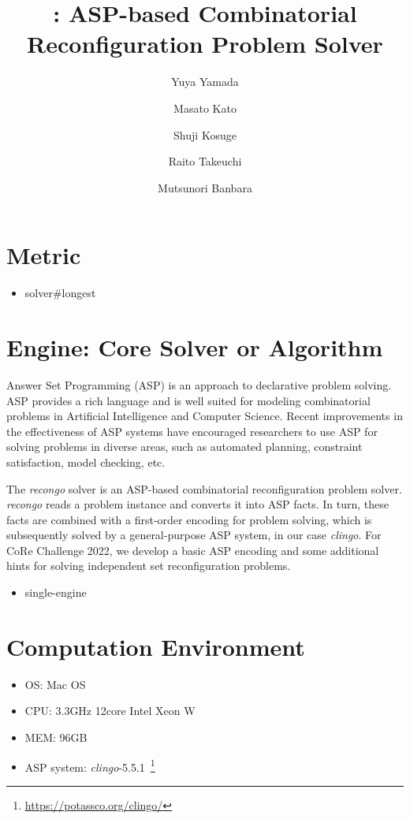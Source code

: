 \documentclass[a4paper,dvipdfmx]{article}
\date{}
\title{{\recongo}: ASP-based Combinatorial Reconfiguration Problem Solver}
\author[1]{Yuya Yamada}
\author[2]{Masato Kato}
\author[2]{Shuji Kosuge}
\author[1]{Raito Takeuchi}
\author[1]{Mutsunori Banbara}
\affil[1]{Graduate School of Informatics, Nagoya University, Japan}
\affil[2]{School of Informatics, Nagoya University, Japan}
\newcommand{\clingo}{\textit{clingo}}
\newcommand{\recongo}{\textit{recongo}}
\begin{document}
\maketitle

\section{Metric}
\begin{itemize}
  \item solver{\#}longest
\end{itemize}

\section{Engine: Core Solver or Algorithm}
Answer Set Programming (ASP) is an approach to declarative problem solving.
ASP provides a rich language and 
is well suited for modeling combinatorial problems 
in Artificial Intelligence and Computer Science.
Recent improvements in the effectiveness of ASP systems
have encouraged researchers to use ASP for solving problems in diverse
areas, such as
automated planning,
constraint satisfaction,
model checking, etc.

The {\recongo} solver is an ASP-based combinatorial reconfiguration
problem solver.
{\recongo} reads a problem instance and converts it into ASP facts.
In turn, these facts are combined with a first-order encoding for
problem solving, which is subsequently solved by a general-purpose ASP
system, in our case {\clingo}.
For CoRe Challenge 2022, we develop a basic ASP encoding and some
additional hints for solving independent set reconfiguration problems.

\begin{itemize}
\item single-engine
\end{itemize}

\section{Computation Environment}
\begin{itemize}
\item OS: Mac OS
\item CPU: 3.3GHz 12core Intel Xeon W
\item MEM: 96GB
\item ASP system: {\clingo}-5.5.1~\footnote{\url{https://potassco.org/clingo/}}
\end{itemize}
\end{document}
